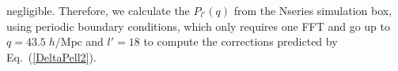                                                                                                                                                                                                                                                                             negligible. 
                                                                                                                                                                                                                                                                            Therefore, we calculate the $P_{l'}(q)$ from the Nseries simulation box, 
                                                                                                                                                                                                                                                                            using periodic boundary conditions, which only requires one FFT and go up to $q = 43.5\;h/\mathrm{Mpc}$ and $l'=18$ to compute the corrections predicted by  Eq.~(\ref{DeltaPell2}).  


